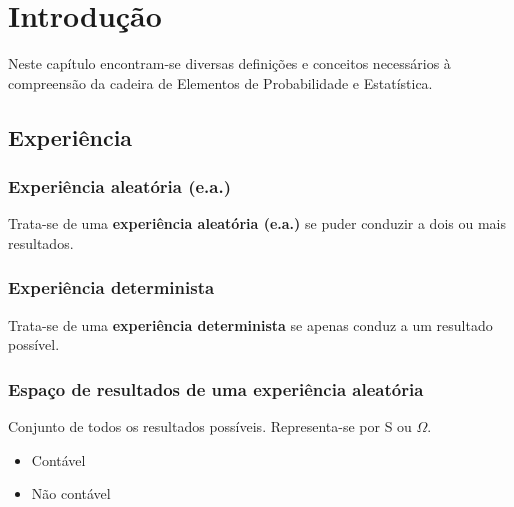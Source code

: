 \chapter{Introdução}
Neste capítulo encontram-se diversas definições e conceitos necessários à compreensão da cadeira de Elementos de Probabilidade e Estatística.

\section{Experiência}

\subsection{Experiência aleatória (e.a.)}
Trata-se de uma \textbf{experiência aleatória (e.a.)} se puder conduzir a dois ou mais resultados.

\subsection{Experiência determinista}
Trata-se de uma \textbf{experiência determinista} se apenas conduz a um resultado possível.

\subsection{Espaço de resultados de uma experiência aleatória}
Conjunto de todos os resultados possíveis.
Representa-se por S ou $\Omega$.
\begin{itemize}
    \item Contável
    \item Não contável
\end{itemize}
